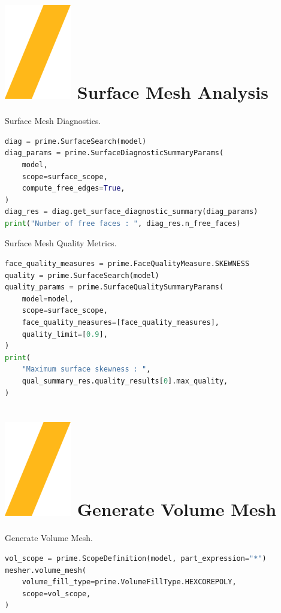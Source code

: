 \documentclass[9pt,landscape]{article}
\begin{document}
\begin{multicols}{3}
\section{\includegraphics[height=\fontcharht\font`\S]{slash.png} Surface Mesh Analysis}
Surface Mesh Diagnostics. 
\begin{lstlisting}[language=Python]
diag = prime.SurfaceSearch(model)
diag_params = prime.SurfaceDiagnosticSummaryParams(
    model,
    scope=surface_scope,
    compute_free_edges=True,
)
diag_res = diag.get_surface_diagnostic_summary(diag_params)
print("Number of free faces : ", diag_res.n_free_faces)
\end{lstlisting}

Surface Mesh Quality Metrics.
\begin{lstlisting}[language=Python]
face_quality_measures = prime.FaceQualityMeasure.SKEWNESS
quality = prime.SurfaceSearch(model)
quality_params = prime.SurfaceQualitySummaryParams(
    model=model,
    scope=surface_scope,
    face_quality_measures=[face_quality_measures],
    quality_limit=[0.9],
)
print(
    "Maximum surface skewness : ",
    qual_summary_res.quality_results[0].max_quality,
)
\end{lstlisting}

\section{\includegraphics[height=\fontcharht\font`\S]{slash.png} Generate Volume Mesh}
Generate Volume Mesh.
\begin{lstlisting}[language=Python]
vol_scope = prime.ScopeDefinition(model, part_expression="*")
mesher.volume_mesh(
    volume_fill_type=prime.VolumeFillType.HEXCOREPOLY,
    scope=vol_scope,
)
\end{lstlisting}


\end{multicols}
\end{document}
